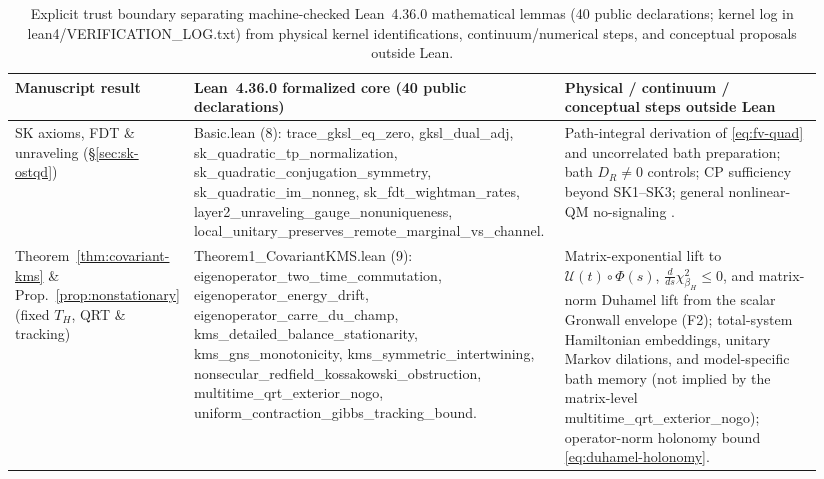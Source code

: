 \documentclass[11pt,a4paper]{article}
\theoremstyle{definition}
\theoremstyle{remark}
\newcommand{\cU}{\mathcal{U}}
\newcommand{\1}{\mathbf{1}}
\newcommand{\code}[1]{{\scriptsize\ttfamily #1}}
\begin{document}
\begin{table}[!tb]
\centering\scriptsize
\caption{Explicit trust boundary separating machine-checked Lean~4.36.0 mathematical lemmas (40 public declarations; kernel log in \code{lean4/VERIFICATION\_LOG.txt}) from physical kernel identifications, continuum/numerical steps, and conceptual proposals outside Lean.}
\label{tab:lean}
\begin{tabular}{@{}>{\raggedright\arraybackslash}p{0.15\linewidth}>{\raggedright\arraybackslash}p{0.46\linewidth}>{\raggedright\arraybackslash}p{0.33\linewidth}@{}}
\toprule
Manuscript result & Lean~4.36.0 formalized core (40 public declarations) & Physical / continuum / conceptual steps outside Lean \\
\midrule
SK axioms, FDT \& unraveling (\S\ref{sec:sk-ostqd}) & \code{Basic.lean} (8): \code{trace\_\allowbreak gksl\_\allowbreak eq\_\allowbreak zero}, \code{gksl\_\allowbreak dual\_\allowbreak adj}, \code{sk\_\allowbreak quadratic\_\allowbreak tp\_\allowbreak normalization}, \code{sk\_\allowbreak quadratic\_\allowbreak conjugation\_\allowbreak symmetry}, \code{sk\_\allowbreak quadratic\_\allowbreak im\_\allowbreak nonneg}, \code{sk\_\allowbreak fdt\_\allowbreak wightman\_\allowbreak rates}, \code{layer2\_\allowbreak unraveling\_\allowbreak gauge\_\allowbreak nonuniqueness}, \code{local\_\allowbreak unitary\_\allowbreak preserves\_\allowbreak remote\_\allowbreak marginal\_\allowbreak vs\_\allowbreak channel}. & Path-integral derivation of \eqref{eq:fv-quad} and uncorrelated bath preparation; bath $D_R\neq 0$ controls; CP sufficiency beyond SK1--SK3; general nonlinear-QM no-signaling \cite{Gisin1990}. \\
Theorem~\ref{thm:covariant-kms} \& Prop.~\ref{prop:nonstationary} (fixed $T_H$, QRT \& tracking) & \code{Theorem1\_\allowbreak CovariantKMS.lean} (9): \code{eigenoperator\_\allowbreak two\_\allowbreak time\_\allowbreak commutation}, \code{eigenoperator\_\allowbreak energy\_\allowbreak drift}, \code{eigenoperator\_\allowbreak carre\_\allowbreak du\_\allowbreak champ}, \code{kms\_\allowbreak detailed\_\allowbreak balance\_\allowbreak stationarity}, \code{kms\_\allowbreak gns\_\allowbreak monotonicity}, \code{kms\_\allowbreak symmetric\_\allowbreak intertwining}, \code{nonsecular\_\allowbreak redfield\_\allowbreak kossakowski\_\allowbreak obstruction}, \code{multitime\_\allowbreak qrt\_\allowbreak exterior\_\allowbreak nogo}, \code{uniform\_\allowbreak contraction\_\allowbreak gibbs\_\allowbreak tracking\_\allowbreak bound}. & Matrix-exponential lift to $\cU(t)\circ\Phi(s)$, $\frac{d}{ds}\chi^2_{\beta_H}\le 0$, and matrix-norm Duhamel lift from the scalar Gronwall envelope (F2); total-system Hamiltonian embeddings, unitary Markov dilations, and model-specific bath memory (not implied by the matrix-level \code{multitime\_qrt\_exterior\_nogo}); operator-norm holonomy bound \eqref{eq:duhamel-holonomy}. \\

\end{tabular}
\end{table}
\end{document}
